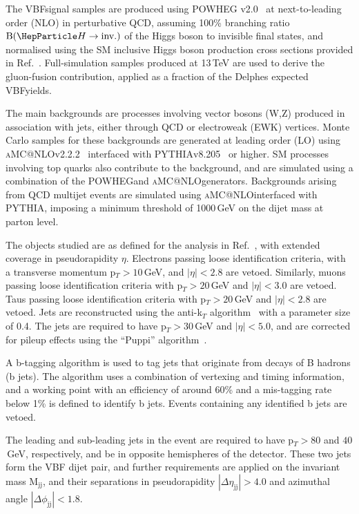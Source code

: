 \documentclass[../report.tex]{subfiles}
\makeatletter
\newcommand{\POWHEG}{\textsc{POWHEG}}
\newcommand{\MGvATNLO}{\textsc{aMC@NLO}}
\newcommand{\PYTHIA}{\textsc{PYTHIA}}
\newcommand{\BHinv}{\ensuremath{\text{B}(\PH\to \text{inv.})}\xspace}
\makeatother
\begin{document}
The VBF\PH signal samples are produced using \POWHEG
v2.0~\cite{Alioli:2010xd,Nason:2009ai} at next-to-leading order (NLO)
in perturbative QCD, assuming 100\% branching ratio \BHinv of the Higgs boson
to invisible final states, and normalised using the SM inclusive Higgs
boson production cross sections provided in Ref.~\cite{deFlorian:2016spz}.  Full-simulation samples produced at 13\,TeV are used to derive the gluon-fusion contribution, applied as a fraction of the Delphes expected VBF\PH yields.

The main backgrounds are processes involving vector bosons (W,Z)
produced in association with jets, either through QCD or electroweak
(EWK) vertices.  Monte Carlo samples for these backgrounds are
generated at leading order (LO) using \MGvATNLO v2.2.2~\cite{Alwall:2014hca} interfaced with \PYTHIA v8.205~\cite{Sjostrand:2014zea} or higher. SM processes involving top quarks also contribute to the
background, and are simulated using a combination of the \POWHEG and \MGvATNLO generators. Backgrounds arising from QCD multijet events are simulated using \MGvATNLO interfaced with \PYTHIA, imposing a minimum threshold of 1000\,GeV on the dijet mass at parton level.


The objects studied are as defined for the analysis in Ref.~\cite{Sirunyan:2018owy}, with extended coverage in pseudorapidity $\eta$. Electrons passing loose
identification criteria, with a transverse momentum p$_T>10$\,GeV, and $|\eta|<2.8$ are vetoed. Similarly, muons passing loose
identification criteria with p$_T>20$\,GeV and $|\eta|<3.0$ are
vetoed. Taus passing loose identification criteria with p$_T>20$\,GeV
and $|\eta|<2.8$ are vetoed. Jets are reconstructed using the
anti-k$_T$ algorithm~\cite{Cacciari:2008gp,Cacciari:2011ma} with a parameter size of
0.4.  The jets are required to have p$_T>30$\,GeV and $|\eta|<5.0$,
and are corrected for pileup effects using the ``Puppi''
algorithm~\cite{Bertolini:2014bba}.

 A b-tagging algorithm is used to tag jets that originate from decays
of B hadrons (b jets).  The algorithm uses a combination of vertexing
and timing information, and a working point with an efficiency of
around 60\% and a mis-tagging rate below 1\% is defined to identify b
jets.  Events containing any identified b jets are vetoed.

The leading and sub-leading jets in the event are required to have
p$_{T}>80$ and $40$\,GeV, respectively, and be in opposite hemispheres of
the detector. These two jets form the VBF dijet pair, and further
requirements are applied on the invariant mass M$_{\text{jj}}$, and
their separations in pseudorapidity $|\Delta\eta_{\text{jj}}|>4.0$ and
azimuthal angle $|\Delta\phi_{\text{jj}}|<1.8$.
\end{document}
